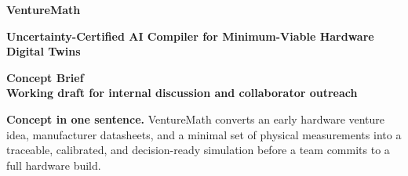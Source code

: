 \documentclass[a4paper,10pt]{article}
\begin{document}
\fontsize{8.8}{10.5}\selectfont

\begin{minipage}[t]{0.73\textwidth}
{\fontsize{21}{22}\selectfont\bfseries\color{VMDark}VentureMath}\par
{\fontsize{11.5}{13}\selectfont\bfseries\color{VMTeal}Uncertainty-Certified AI Compiler for Minimum-Viable Hardware Digital Twins}
\end{minipage}
\hfill
\begin{minipage}[t]{0.24\textwidth}
\raggedleft
\colorbox{VMLight}{\parbox{0.94\linewidth}{\centering\bfseries\color{VMDark}Concept Brief\\[-1pt]\normalfont\fontsize{7.8}{8.8}\selectfont Working draft for internal discussion and collaborator outreach}}
\end{minipage}

\vspace{2mm}

\begin{vmHighlight}
\textbf{Concept in one sentence.} VentureMath converts an early hardware venture idea, manufacturer datasheets, and a minimal set of physical measurements into a traceable, calibrated, and decision-ready simulation before a team commits to a full hardware build.
\end{vmHighlight}
\end{document}
